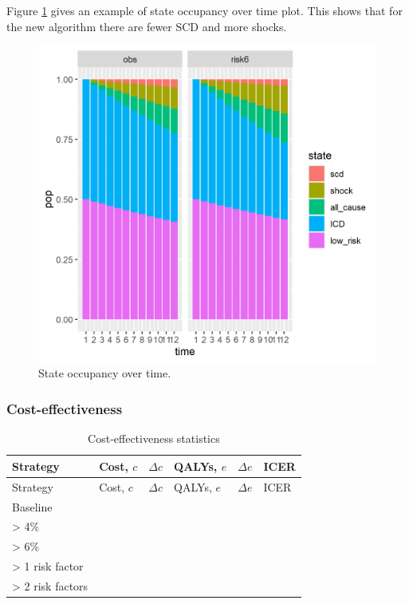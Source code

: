 \documentclass[
]{article}
\begin{document}
Figure \ref{fig:statepop} gives an example of state occupancy over time plot.
This shows that for the new algorithm there are fewer SCD and more shocks.

\begin{figure}

{\centering \includegraphics[width=20.31in]{../../images/state_pop_over_time} 

}

\caption{State occupancy over time.}\label{fig:statepop}
\end{figure}

\hypertarget{cost-effectiveness}{%
\subsubsection{Cost-effectiveness}\label{cost-effectiveness}}

\begin{longtable}[]{@{}llllll@{}}
\caption{Cost-effectiveness statistics}\tabularnewline
\toprule
Strategy & Cost, \(c\) & \(\Delta c\) & QALYs, \(e\) & \(\Delta e\) & ICER \\
\midrule
\endfirsthead
\toprule
Strategy & Cost, \(c\) & \(\Delta c\) & QALYs, \(e\) & \(\Delta e\) & ICER \\
\midrule
\endhead
Baseline & & & & & \\
\textgreater{} 4\% & & & & & \\
\textgreater{} 6\% & & & & & \\
\textgreater{} 1 risk factor & & & & & \\
\textgreater{} 2 risk factors & & & & & \\
\bottomrule
\end{longtable}
\end{document}
